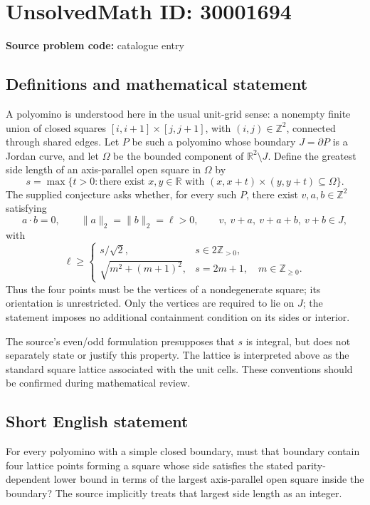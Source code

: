 \documentclass[11pt]{article}
\newcommand{\Z}{\mathbb{Z}}
\newcommand{\R}{\mathbb{R}}
\begin{document}
\section*{UnsolvedMath ID: 30001694}
\textbf{Source problem code:} catalogue entry
\subsection{Definitions and mathematical statement}
A polyomino is understood here in the usual unit-grid sense: a nonempty finite union of closed squares \([i,i+1]\times[j,j+1]\), with \((i,j)\in\Z^2\), connected through shared edges. Let \(P\) be such a polyomino whose boundary \(J=\partial P\) is a Jordan curve, and let \(\Omega\) be the bounded component of \(\R^2\setminus J\). Define the greatest side length of an axis-parallel open square in \(\Omega\) by
\[
s=\max\bigl\{t>0:\text{there exist }x,y\in\R\text{ with }(x,x+t)\times(y,y+t)\subseteq\Omega\bigr\}.
\]
The supplied conjecture asks whether, for every such \(P\), there exist \(v,a,b\in\Z^2\) satisfying
\[
a\cdot b=0,\qquad \|a\|_2=\|b\|_2=\ell>0,
\qquad v,\ v+a,\ v+a+b,\ v+b\in J,
\]
with
\[
\ell\ge
\begin{cases}
s/\sqrt{2},&s\in 2\Z_{>0},\\[2pt]
\sqrt{m^2+(m+1)^2},&s=2m+1,\quad m\in\Z_{\ge0}.
\end{cases}
\]
Thus the four points must be the vertices of a nondegenerate square; its orientation is unrestricted. Only the vertices are required to lie on \(J\); the statement imposes no additional containment condition on its sides or interior.

The source's even/odd formulation presupposes that \(s\) is integral, but does not separately state or justify this property. The lattice is interpreted above as the standard square lattice associated with the unit cells. These conventions should be confirmed during mathematical review.
\subsection{Short English statement}
For every polyomino with a simple closed boundary, must that boundary contain four lattice points forming a square whose side satisfies the stated parity-dependent lower bound in terms of the largest axis-parallel open square inside the boundary? The source implicitly treats that largest side length as an integer.
\end{document}
